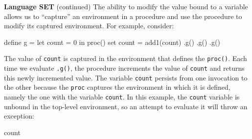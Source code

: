 \begin{minipage}[t]{\sw}
\slidenumber
\LARGE
{\bf Language SET} (continued)\exx
The ability to modify the value bound to a variable allows us
to ``capture'' an environment in a procedure
and use the procedure to modify its captured environment.
For example, consider:
\begin{qv}
define g = let
             count = 0
           in
             proc() set count = add1(count)
.g() %
.g() %
.g() %
\end{qv}
The value of \verb'count' is captured in the environment
that defines the \verb'proc()'.
Each time we evaluate \verb'.g()',
the procedure increments the value of \verb'count'
and returns this newly incremented value.
The variable \verb'count' persists
from one invocation to the other
because the \verb'proc' captures the environment
in which it is defined,
namely the one with the variable \verb'count'.\exx
In this example,
the \verb'count' variable is unbound in the top-level environment,
so an attempt to evaluate it will throw an exception:
\begin{qv}
count %
\end{qv}
\end{minipage}
